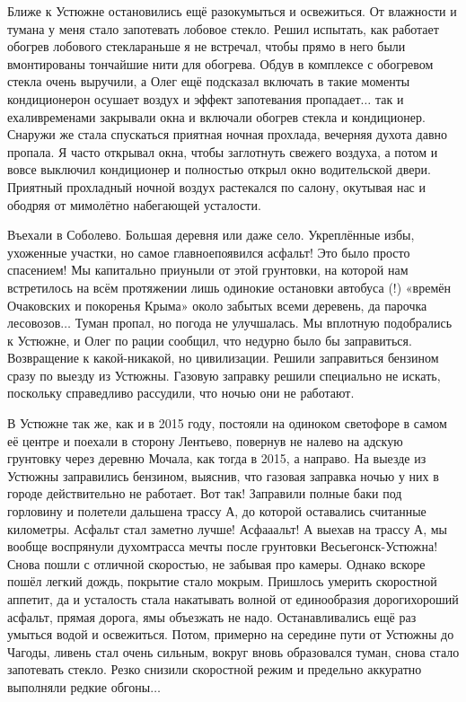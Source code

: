 Ближе к Устюжне остановились ещё разок\mdash умыться и освежиться. От влажности и тумана у меня стало запотевать лобовое стекло. Решил испытать, как работает обогрев лобового стекла\mdash раньше я не встречал, чтобы прямо в него были вмонтированы тончайшие нити для обогрева. Обдув в комплексе с обогревом стекла очень выручили, а Олег ещё подсказал включать в такие моменты кондиционер\mdash он осушает воздух и эффект запотевания пропадает$\ldots$ так и ехали\mdash временами закрывали окна и включали обогрев стекла и кондиционер. Снаружи же стала спускаться приятная ночная прохлада, вечерняя духота давно пропала. Я часто открывал окна, чтобы заглотнуть свежего воздуха, а потом и вовсе выключил кондиционер и полностью открыл окно водительской двери. Приятный прохладный ночной воздух растекался по салону, окутывая нас и ободряя от мимолётно набегающей усталости.

Въехали в Соболево. Большая деревня или даже село. Укреплённые избы, ухоженные участки, но самое главное\mdash появился асфальт! Это было просто спасением! Мы капитально приуныли от этой грунтовки, на которой нам встретилось на всём протяжении лишь одинокие остановки автобуса (!) «времён Очаковских и покоренья Крыма» около забытых всеми деревень, да парочка лесовозов$\ldots$ Туман пропал, но погода не улучшалась. Мы вплотную подобрались к Устюжне, и Олег по рации сообщил, что недурно было бы заправиться. Возвращение к какой-никакой, но цивилизации. Решили заправиться бензином сразу по выезду из Устюжны. Газовую заправку решили специально не искать, поскольку справедливо рассудили, что ночью они не работают.

В Устюжне так же, как и в 2015 году, постояли на одиноком светофоре в самом её центре и поехали в сторону Лентьево, повернув не налево на адскую грунтовку через деревню Мочала, как тогда в 2015, а направо. На выезде из Устюжны заправились бензином, выяснив, что газовая заправка ночью у них в городе действительно не работает. Вот так! Заправили полные баки под горловину и полетели дальше\mdash на трассу А, до которой оставались считанные километры. Асфальт стал заметно лучше! Асфа\sdash а\sdash альт! А выехав на трассу А, мы вообще воспрянули духом\mdash трасса мечты после грунтовки Весьегонск-Устюжна! Снова пошли с отличной скоростью, не забывая про камеры. Однако вскоре пошёл легкий дождь, покрытие стало мокрым. Пришлось умерить скоростной аппетит, да и усталость стала накатывать волной от единообразия дороги\mdash хороший асфальт, прямая дорога, ямы объезжать не надо. Останавливались ещё раз умыться водой и освежиться. Потом, примерно на середине пути от Устюжны до Чагоды, ливень стал очень сильным, вокруг вновь образовался туман, снова стало запотевать стекло. Резко снизили скоростной режим и предельно аккуратно выполняли редкие обгоны$\ldots$

